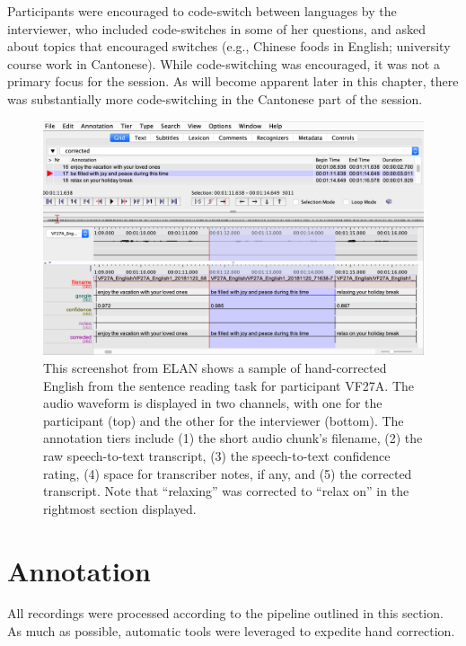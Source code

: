 Participants were encouraged to code-switch between languages by the interviewer, who included code-switches in some of her questions, and asked about topics that encouraged switches (e.g., Chinese foods in English; university course work in Cantonese). While code-switching was encouraged, it was not a primary focus for the session. As will become apparent later in this chapter, there was substantially more code-switching in the Cantonese part of the session.

\begin{figure}[ht]
\begin{center}
\includegraphics[width=4.9in]{figures/ch2_elan.png} 
\caption{This screenshot from ELAN shows a sample of hand-corrected English from the sentence reading task for participant VF27A. The audio waveform is displayed in two channels, with one for the participant (top) and the other for the interviewer (bottom). The annotation tiers include (1) the short audio chunk's filename, (2) the raw speech-to-text transcript, (3) the speech-to-text confidence rating, (4) space for transcriber notes, if any, and (5) the corrected transcript. Note that ``relaxing'' was corrected to ``relax on'' in the rightmost section displayed.}
\label{ch2:fig:elan}
\end{center}
\end{figure}

\section{Annotation}\label{ch2:sec:annotation}
All recordings were processed according to the pipeline outlined in this section. As much as possible, automatic tools were leveraged to expedite hand correction. 

